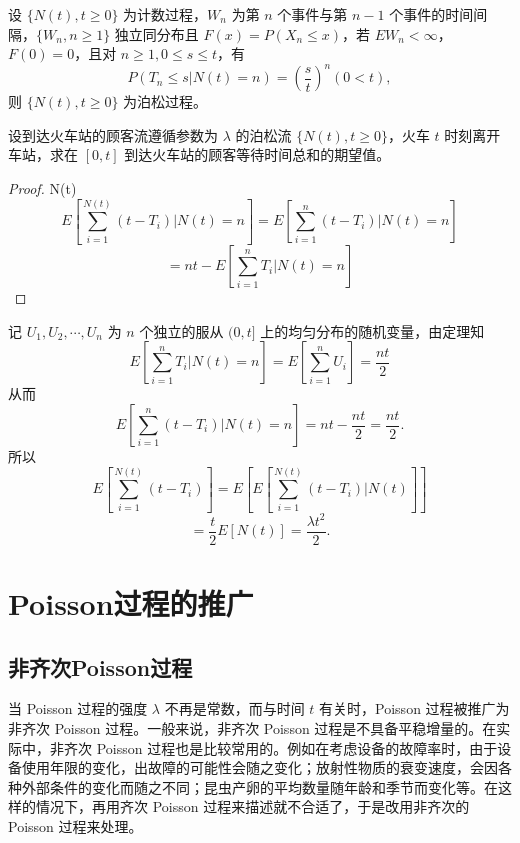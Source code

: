 \documentclass[lang=cn,10pt,thmcnt=section]{elegantbook}
\begin{document}
\begin{theorem}
	设 $\{N(t), t \geq 0\}$ 为计数过程，$W_n$ 为第 $n$ 个事件与第 $n-1$ 个事件的时间间隔，$\{W_n, n \geq 1\}$ 独立同分布且 $F(x) = P(X_n \leq x)$，若 $EW_n < \infty$，$F(0) = 0$，且对 $n \geq 1, 0 \leq s \leq t$，有
\[
P(T_n \leq s | N(t) = n) = \left(\frac{s}{t}\right)^n (0 < t),
\]
则 $\{N(t), t \geq 0\}$ 为泊松过程。
\end{theorem}

\begin{example}
	设到达火车站的顾客流遵循参数为 $\lambda$ 的泊松流 $\{N(t), t \geq 0\}$，火车 $t$ 时刻离开车站，求在 $[0,t]$ 到达火车站的顾客等待时间总和的期望值。
\end{example}
\begin{proof}
	 N(t) 
\[
E\left[\sum_{i=1}^{N(t)} (t - T_i) | N(t) = n\right] = E\left[\sum_{i=1}^{n} (t - T_i) | N(t) = n\right]
\]
\[
= nt - E\left[\sum_{i=1}^{n} T_i | N(t) = n\right]
\]

\end{proof}

\begin{example}
	记 $U_1, U_2, \cdots, U_n$ 为 $n$ 个独立的服从 $(0,t]$ 上的均匀分布的随机变量，由定理知
\[
E\left[\sum_{i=1}^{n} T_i | N(t) = n\right] = E\left[\sum_{i=1}^{n} U_i\right] = \frac{nt}{2}
\]
从而
\[
E\left[\sum_{i=1}^{n} (t - T_i) | N(t) = n\right] = nt - \frac{nt}{2} = \frac{nt}{2}.
\]
所以
\[
E\left[\sum_{i=1}^{N(t)} (t - T_i)\right] = E\left[E\left[\sum_{i=1}^{N(t)} (t - T_i) | N(t)\right]\right]
\]
\[
= \frac{t}{2} E[N(t)] = \frac{\lambda t^2}{2}.
\]
\end{example}

\section{Poisson过程的推广}

\subsection{非齐次Poisson过程}
当 Poisson 过程的强度 $\lambda$ 不再是常数，而与时间 $t$ 有关时，Poisson 过程被推广为非齐次 Poisson 过程。一般来说，非齐次 Poisson 过程是不具备平稳增量的。在实际中，非齐次 Poisson 过程也是比较常用的。例如在考虑设备的故障率时，由于设备使用年限的变化，出故障的可能性会随之变化；放射性物质的衰变速度，会因各种外部条件的变化而随之不同；昆虫产卵的平均数量随年龄和季节而变化等。在这样的情况下，再用齐次 Poisson 过程来描述就不合适了，于是改用非齐次的 Poisson 过程来处理。
\end{document}
